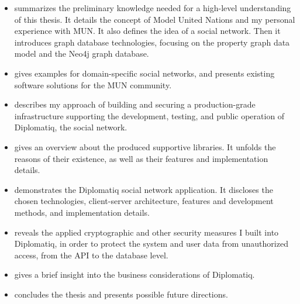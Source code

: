 \begin{itemize}
\item \emph{} summarizes the preliminary knowledge needed for a high-level understanding of this thesis. It details the concept of Model United Nations and my personal experience with MUN. It also defines the idea of a social network. Then it introduces graph database technologies, focusing on the property graph data model and the Neo4j graph database.
\item \emph{} gives examples for domain-specific social networks, and presents existing software solutions for the MUN community.
\item \emph{} describes my approach of building and securing a production-grade infrastructure supporting the development, testing, and public operation of Diplomatiq, the social network.
\item \emph{} gives an overview about the produced supportive libraries. It unfolds the reasons of their existence, as well as their features and implementation details.
\item \emph{} demonstrates the Diplomatiq social network application. It discloses the chosen technologies, client-server architecture, features and development methods, and implementation details.
\item \emph{} reveals the applied cryptographic and other security measures I built into Diplomatiq, in order to protect the system and user data from unauthorized access, from the API to the database level.
\item \emph{} gives a brief insight into the business considerations of Diplomatiq.
\item \emph{} concludes the thesis and presents possible future directions.
\end{itemize}

